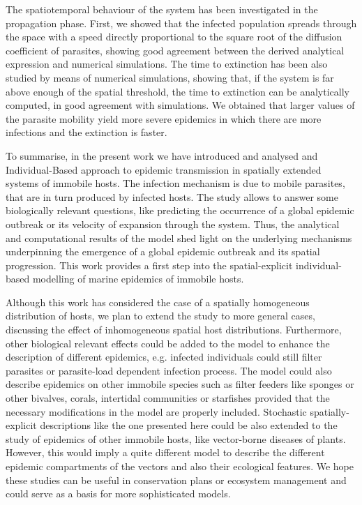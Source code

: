 The spatiotemporal behaviour of the system has been investigated in the
propagation phase. First, we showed that the infected population spreads
through the space with a speed directly proportional to the square root of the
diffusion coefficient of parasites, showing good agreement between the derived
analytical expression and numerical simulations. The time to extinction has
been also studied by means of numerical simulations, showing that, if the
system is far above enough of the spatial threshold, the time to extinction can
be analytically computed, in good agreement with simulations. We obtained that
larger values of the parasite mobility yield more severe epidemics in which
there are more infections and the extinction is faster.

To summarise, in the present work we have introduced and analysed and
Individual-Based approach to epidemic transmission in spatially extended
systems of immobile hosts. The infection mechanism is due to mobile parasites,
that are in turn produced by infected hosts. The study allows to answer some
biologically relevant questions, like predicting the occurrence of a global
epidemic outbreak or its velocity of expansion through the system. Thus, the
analytical and computational results of the model shed light on the underlying
mechanisms underpinning the emergence of a global epidemic outbreak and its
spatial progression. This work provides a first step into the spatial-explicit
individual-based modelling of marine epidemics of immobile hosts.

Although this work has considered the case of a spatially homogeneous
distribution of hosts, we plan to extend the study to more general cases,
discussing the effect of inhomogeneous spatial host distributions. Furthermore,
other biological relevant effects could be added to the model to enhance the
description of different epidemics, e.g. infected individuals could still
filter parasites or parasite-load dependent infection process. The model could
also describe epidemics on other immobile species such as filter feeders like
sponges or other bivalves, corals, intertidal communities or starfishes
provided that the necessary modifications in the model are properly included.
Stochastic spatially-explicit descriptions like the one presented here could be
also extended to the study of epidemics of other immobile hosts, like
vector-borne diseases of plants. However, this would imply a quite different
model to describe the different epidemic compartments of the vectors and also
their ecological features. We hope these studies can be useful in conservation
plans or ecosystem management and could serve as a basis for more sophisticated
models.